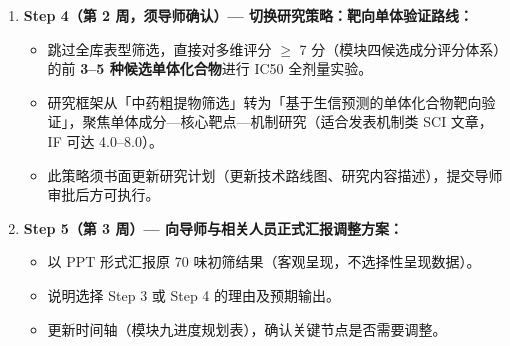 \documentclass[12pt,a4paper,twoside]{article}
\begin{document}
\begin{warningbox}
\begin{enumerate}
  \item \textbf{Step 4（第 2 周，须导师确认）--- 切换研究策略：靶向单体验证路线：}
  \begin{itemize}
    \item 跳过全库表型筛选，直接对多维评分 $\geq$ 7 分（模块四候选成分评分体系）的前 \textbf{3--5 种候选单体化合物}进行 IC50 全剂量实验。
    \item 研究框架从「中药粗提物筛选」转为「基于生信预测的单体化合物靶向验证」，聚焦单体成分—核心靶点—机制研究（适合发表机制类 SCI 文章，IF 可达 4.0--8.0）。
    \item 此策略须书面更新研究计划（更新技术路线图、研究内容描述），提交导师审批后方可执行。
  \end{itemize}

  \item \textbf{Step 5（第 3 周）--- 向导师与相关人员正式汇报调整方案：}
  \begin{itemize}
    \item 以 PPT 形式汇报原 70 味初筛结果（客观呈现，不选择性呈现数据）。
    \item 说明选择 Step 3 或 Step 4 的理由及预期输出。
    \item 更新时间轴（模块九进度规划表），确认关键节点是否需要调整。
  \end{itemize}
\end{enumerate}
\end{warningbox}
\end{document}
